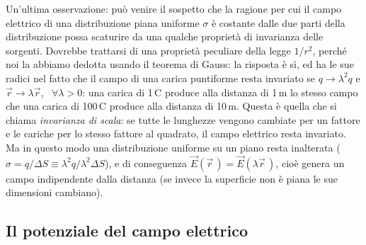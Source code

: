Un'ultima osservazione: può venire il sospetto che la ragione per cui il campo elettrico di una distribuzione piana uniforme $\sigma$ è costante dalle due parti della distribuzione possa scaturire da una qualche proprietà di invarianza delle sorgenti. Dovrebbe trattarsi di una proprietà peculiare della legge $1/r^2$, perché noi la abbiamo dedotta usando il teorema di Gauss: la risposta è sì, ed ha le sue radici nel fatto che il campo di una carica puntiforme resta invariato se $q\to\lambda^2q$ e $\vec r\to\lambda\vec r$, \ $\forall\lambda>0$: una carica di 1\,C produce alla distanza di 1\,m lo stesso campo che una carica di 100\,C produce alla distanza di 10\,m. Questa è quella che si chiama \emph{invarianza di scala}: se tutte le lunghezze vengono cambiate per un fattore e le cariche per lo stesso fattore al quadrato, il campo elettrico resta invariato. Ma in questo modo una distribuzione uniforme su un piano resta inalterata ($\sigma=q/\Delta S\equiv\lambda^2q/\lambda^2\Delta S$), e di conseguenza $\vec E(\vec r\,)=\vec E(\lambda\vec r\,)$, cioè genera un campo indipendente dalla distanza (se invece la superficie non è piana le sue dimensioni cambiano).

\subsection{Il potenziale del campo elettrico}

